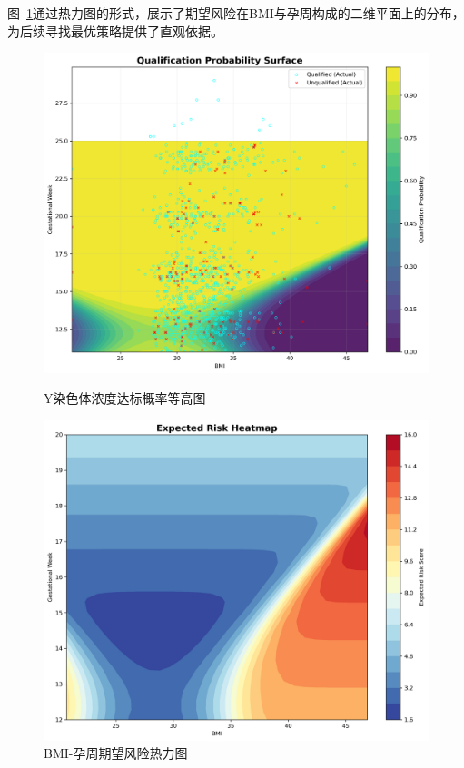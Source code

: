 图~\ref{fig:expected_risk_heatmap}通过热力图的形式，展示了期望风险在BMI与孕周构成的二维平面上的分布，为后续寻找最优策略提供了直观依据。

\begin{figure}[htbp]
    \centering
    \begin{minipage}{0.48\textwidth}
        \centering
        \includegraphics[width=\textwidth]{q2/qualification_probability_surface.png}
        \caption{Y染色体浓度达标概率等高图}
        \label{fig:qualification_probability}
    \end{minipage}
    \hfill
    \begin{minipage}{0.48\textwidth}
        \centering
        \includegraphics[width=\textwidth]{q2/expected_risk_heatmap.png}
        \caption{BMI-孕周期望风险热力图}
        \label{fig:expected_risk_heatmap}
    \end{minipage}
\end{figure}

